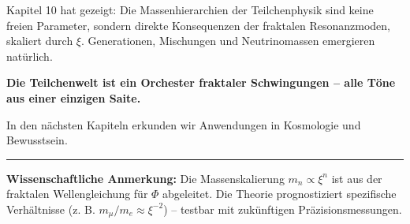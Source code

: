 	Kapitel 10 hat gezeigt: Die Massenhierarchien der Teilchenphysik sind keine freien Parameter, sondern direkte Konsequenzen der fraktalen Resonanzmoden, skaliert durch \(\xi\). Generationen, Mischungen und Neutrinomassen emergieren natürlich.
	
	\textbf{Die Teilchenwelt ist ein Orchester fraktaler Schwingungen – alle Töne aus einer einzigen Saite.}
	
	In den nächsten Kapiteln erkunden wir Anwendungen in Kosmologie und Bewusstsein.
	
	\vspace{1cm}
	\hrule
	\vspace{0.5cm}
	\noindent\textbf{Wissenschaftliche Anmerkung:} Die Massenskalierung \(m_n \propto \xi^n\) ist aus der fraktalen Wellengleichung für \(\Phi\) abgeleitet. Die Theorie prognostiziert spezifische Verhältnisse (z. B. \(m_\mu / m_e \approx \xi^{-2}\)) – testbar mit zukünftigen Präzisionsmessungen.





